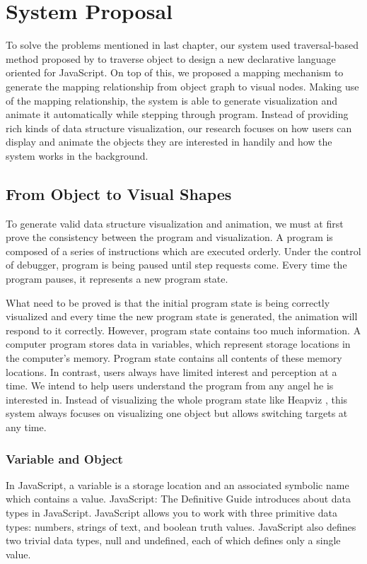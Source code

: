 \chapter {System Proposal}
To solve the problems mentioned in last chapter, our system used traversal-based method proposed by \cite{729554} to traverse object to design a new declarative language oriented for JavaScript. On top of this, we proposed a mapping mechanism to generate the mapping relationship from object graph to visual nodes. Making use of the mapping relationship, the system is able to generate visualization and animate it automatically while stepping through program. Instead of providing rich kinds of data structure visualization, our research focuses on how users can display and animate the objects they are interested in handily and how the system works in the background.

\section {From Object to Visual Shapes}
To generate valid data structure visualization and animation, we must at first prove the consistency between the program and visualization. A program is composed of a series of instructions which are executed orderly. Under the control of debugger, program is being paused until step requests come. Every time the program pauses, it represents a new program state. 

What need to be proved is that the initial program state is being correctly visualized and every time the new program state is generated, the animation will respond to it correctly. However, program state contains too much information. A computer program stores data in variables, which represent storage locations in the computer's memory. Program state contains all contents of these memory locations. In contrast, users always have limited interest and perception at a time. We intend to help users understand the program from any angel he is interested in. Instead of visualizing the whole program state like Heapviz \cite{Aftandilian:2010:HIH:1879211.1879222}, this system always focuses on visualizing one object but allows switching targets at any time.

\subsection {Variable and Object}
In JavaScript, a variable is a storage location and an associated symbolic name which contains a value. JavaScript: The Definitive Guide \cite{Flanagan:1998:JDG:551216} introduces about data types in JavaScript. JavaScript allows you to work with three primitive data types: numbers, strings of text, and boolean truth values. JavaScript also defines two trivial data types, null and undefined, each of which defines only a single value.

